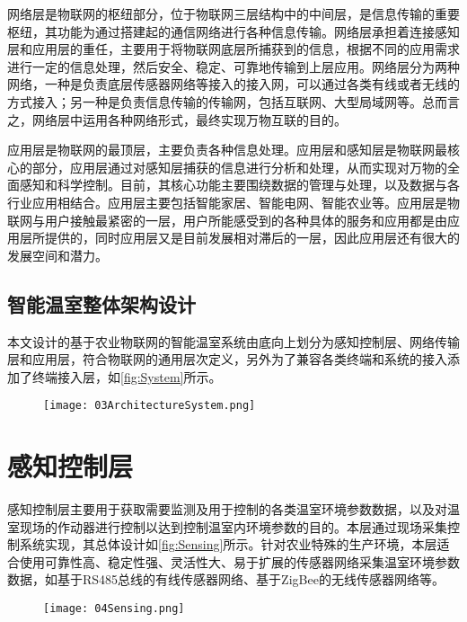 网络层是物联网的枢纽部分，位于物联网三层结构中的中间层，是信息传输的重要枢纽，其功能为通过搭建起的通信网络进行各种信息传输。网络层承担着连接感知层和应用层的重任，主要用于将物联网底层所捕获到的信息，根据不同的应用需求进行一定的信息处理，然后安全、稳定、可靠地传输到上层应用。网络层分为两种网络，一种是负责底层传感器网络等接入的接入网，可以通过各类有线或者无线的方式接入；另一种是负责信息传输的传输网，包括互联网、大型局域网等。总而言之，网络层中运用各种网络形式，最终实现万物互联的目的。

应用层是物联网的最顶层，主要负责各种信息处理。应用层和感知层是物联网最核心的部分，应用层通过对感知层捕获的信息进行分析和处理，从而实现对万物的全面感知和科学控制。目前，其核心功能主要围绕数据的管理与处理，以及数据与各行业应用相结合。应用层主要包括智能家居、智能电网、智能农业等。应用层是物联网与用户接触最紧密的一层，用户所能感受到的各种具体的服务和应用都是由应用层所提供的，同时应用层又是目前发展相对滞后的一层，因此应用层还有很大的发展空间和潜力。

	
	\subsection{智能温室整体架构设计}
	本文设计的基于农业物联网的智能温室系统由底向上划分为感知控制层、网络传输层和应用层，符合物联网的通用层次定义，另外为了兼容各类终端和系统的接入添加了终端接入层，如\ref{fig:System}所示。	

		\begin{figure}[!htp]
  			\centering
 			\texttt{[image: 03ArchitectureSystem.png]}
		\end{figure}
		
\section{感知控制层}
感知控制层主要用于获取需要监测及用于控制的各类温室环境参数数据，以及对温室现场的作动器进行控制以达到控制温室内环境参数的目的。本层通过现场采集控制系统实现，其总体设计如\ref{fig:Sensing}所示。针对农业特殊的生产环境，本层适合使用可靠性高、稳定性强、灵活性大、易于扩展的传感器网络采集温室环境参数数据，如基于RS485总线的有线传感器网络、基于ZigBee的无线传感器网络等。
		\begin{figure}[!htp]
  			\centering
 			\texttt{[image: 04Sensing.png]}
		\end{figure}

